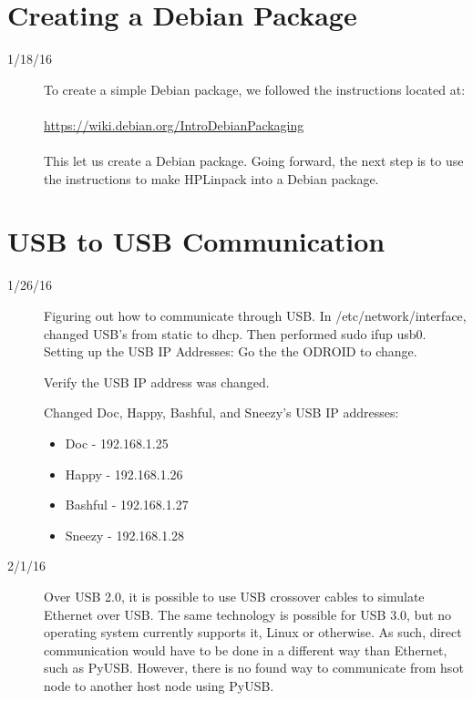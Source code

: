 \section{Creating a Debian Package}
\begin{description}
\item [1/18/16] To create a simple Debian package, we followed the instructions located at:\\ \\
\url{https://wiki.debian.org/IntroDebianPackaging}\\ \\
This let us create a Debian package. Going forward, the next step is to use the instructions to make HPLinpack into a Debian package.
\end{description}

\section{USB to USB Communication}
\begin{description}
\item [1/26/16] Figuring out how to communicate through USB. In /etc/network/interface, changed USB's from static to dhcp. Then performed sudo ifup usb0.
Setting up the USB IP Addresses:
Go the the ODROID to change.




Verify the USB IP address was changed.

Changed Doc, Happy, Bashful, and Sneezy's USB IP addresses:
	\begin{itemize}
		\item Doc - 192.168.1.25
		\item Happy - 192.168.1.26
		\item Bashful - 192.168.1.27
		\item Sneezy - 192.168.1.28
	\end{itemize}
\item[2/1/16] Over USB 2.0, it is possible to use USB crossover cables to simulate Ethernet over USB. The same technology is possible for USB 3.0, but no operating system currently supports it, Linux or otherwise. As such, direct communication would have to be done in a different way than Ethernet, such as PyUSB. However, there is no found way to communicate from hsot node to another host node using PyUSB.
\end{description}

